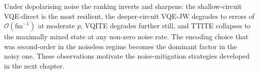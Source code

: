 Under depolarising noise the ranking inverts and sharpens: the
shallow-circuit VQE-direct is the most resilient, the deeper-circuit
VQE-JW degrades to errors of $\mathcal{O}(\text{fm}^{-1})$ at moderate
$p$, VQITE degrades further still, and TTITE collapses to the
maximally mixed state at any non-zero noise rate. The encoding choice
that was second-order in the noiseless regime becomes the dominant
factor in the noisy one. These observations motivate the
noise-mitigation strategies developed in the next chapter.
